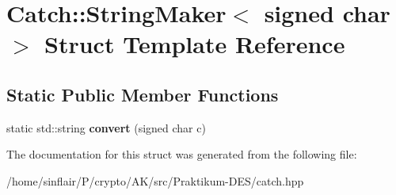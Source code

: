 \hypertarget{structCatch_1_1StringMaker_3_01signed_01char_01_4}{}\section{Catch\+:\+:String\+Maker$<$ signed char $>$ Struct Template Reference}
\label{structCatch_1_1StringMaker_3_01signed_01char_01_4}
\subsection*{Static Public Member Functions}
\begin{DoxyCompactItemize}
\item 
\mbox{\label{structCatch_1_1StringMaker_3_01signed_01char_01_4_a5ec41f32916539dc90130539db8222cf}} 
static std\+::string {\bfseries convert} (signed char c)
\end{DoxyCompactItemize}


The documentation for this struct was generated from the following file\+:\begin{DoxyCompactItemize}
\item 
/home/sinflair/\+P/crypto/\+A\+K/src/\+Praktikum-\/\+D\+E\+S/catch.\+hpp\end{DoxyCompactItemize}
